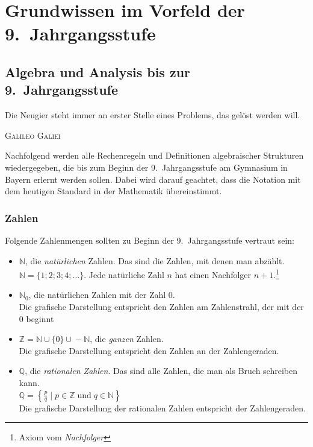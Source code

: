 
\part{Grundwissen im Vorfeld der 9.~Jahrgangsstufe}


\chapter{Algebra und Analysis bis zur 9.~Jahrgangsstufe}
\label{ch:grundwissen}
\epigraph{Die Neugier steht immer an erster Stelle eines Problems, das gelöst werden will.}{\textsc{Galileo Galiei}}


Nachfolgend werden alle Rechenregeln und Definitionen algebraischer Strukturen wiedergegeben, die bis zum Beginn der 9.~Jahrgangsstufe am Gymnasium in Bayern erlernt werden sollen. Dabei wird darauf geachtet, dass die Notation mit dem heutigen Standard in der Mathematik übereinstimmt.

\section{Zahlen}

Folgende Zahlenmengen sollten zu Beginn der 9.~Jahrgangsstufe vertraut sein:
\begin{itemize}
 \item \(\mathbb{N}\), die \emph{natürlichen} Zahlen. Das sind die Zahlen, mit denen man abzählt.\\
       \(\mathbb{N}=\lbrace 1;2;3;4;\ldots\rbrace\).
       Jede natürliche Zahl \(n\) hat einen Nachfolger \(n+1\).\footnote{Axiom vom \emph{Nachfolger}}
 \item \(\mathbb{N}_0\), die natürlichen Zahlen mit der Zahl \(0\).\\
 Die grafische Darstellung entspricht den Zahlen am Zahlenstrahl, der mit der \(0\) beginnt
 \item \(\mathbb{Z} = \mathbb{N}\cup \lbrace 0\rbrace \cup{}-\mathbb{N}\), die \emph{ganzen} Zahlen.\\
 Die grafische Darstellung entspricht den Zahlen an der Zahlengeraden.
 \item \(\mathbb{Q}\), die \emph{rationalen Zahlen}. Das sind alle Zahlen, die man als Bruch schreiben kann.\\
       \(\mathbb{Q} = \left\lbrace \frac{p}{q} \mid p\in\mathbb{Z}\;\text{und}\; q\in\mathbb{N}\right\rbrace\)\\
 Die grafische Darstellung der rationalen Zahlen entspricht der Zahlengeraden.
\end{itemize}

